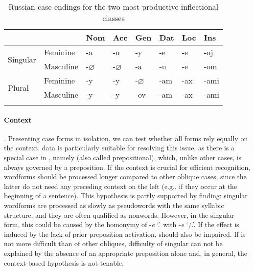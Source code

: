 \documentclass[output=paper, modfonts,newtxmath,hidelinks]{langscibook}
\begin{document}
\begin{table}
    \centering
	\caption{Russian case endings for the two most productive inflectional classes}
    \label{tab:rusDecl}
	\begin{tabular}{*{8}l}
		\lsptoprule
        ~	&	~	&	Nom    &	Acc	 & Gen  &	Dat &	Loc &	Ins	\\
        \midrule
		\multirow{2}{*}{Singular} & Feminine	&	-a  &	-u	&	-y	&	-e	& -e    &	-oj\\
		&	Masculine			&	-$\varnothing$  & -$\varnothing$    &	-a	&	-u	&   -e  &	-om	\\
        \midrule
        \multirow{2}{*}{Plural} & Feminine	& -y    & -y    &	-$\varnothing$ & -am  & -ax & -ami \\
        &	Masculine & -y  & -y &	-ov & -am    & -ax & -ami\\
		\lspbottomrule
    \end{tabular}
\end{table}

\paragraph*{Context}. Presenting case forms in isolation, we can test whether all  forms  rely equally on the context.  data is particularly suitable for resolving this issue, as there is a special case in , namely  (also called prepositional), which, unlike other cases, is always governed by a preposition. If the context is crucial for efficient  recognition,  wordforms should be processed longer compared to other oblique cases, since the latter do not need any preceding context on the left (e.g., if they occur at the beginning of a sentence). This hypothesis is partly supported by  finding:   singular wordforms are processed as slowly as pseudowords with the same syllabic structure, and they are often qualified as nonwords. However, in the singular form, this  could be caused by the homonymy of -\textit{e} `\locc.\masc' with  -\textit{e} `\datt/\locc.\fem'. If the effect is induced by the lack of prior preposition activation,    should also be impaired. If    is not more difficult than  of other obliques, difficulty of   singular can not be explained by the absence of an appropriate preposition alone and, in general, the context-based hypothesis is not tenable. 
\end{document}
